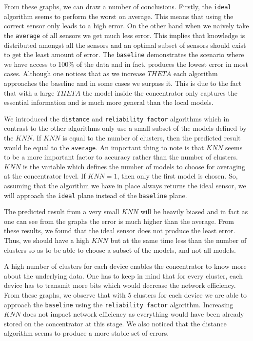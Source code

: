 \documentclass{mproj}
\begin{document}
From these graphs, we can draw a number of conclusions. Firstly, the \texttt{ideal} algorithm seems to perform the worst on average. This means that using the correct sensor only leads to a high error. On the other hand when we naively take the \texttt{average} of all sensors we get much less error. This implies that knowledge is distributed amongst all the sensors and an optimal subset of sensors should exist to get the least amount of error. The \texttt{baseline} demonstrates the scenario where we have access to 100\% of the data and in fact, produces the lowest error in most cases. Although one notices that as we increase $THETA$ each algorithm approaches the baseline and in some cases we surpass it. This is due to the fact that with a large $THETA$ the model inside the concentrator only captures the essential information and is much more general than the local models.

We introduced the \texttt{distance} and \texttt{reliability factor} algorithms which in contrast to the other algorithms only use a small subset of the models defined by the $KNN$. If $KNN$ is equal to the number of clusters, then the predicted result would be equal to the \texttt{average}. An important thing to note is that $KNN$ seems to be a more important factor to accuracy rather than the number of clusters. $KNN$ is the variable which defines the number of models to choose for averaging at the concentrator level. If $KNN=1$, then only the first model is chosen. So, assuming that the algorithm we have in place always returns the ideal sensor, we will approach the \texttt{ideal} plane instead of the \texttt{baseline} plane.

The predicted result from a very small $KNN$ will be heavily biased and in fact as one can see from the graphs the error is much higher than the average. From these results, we found that the ideal sensor does not produce the least error. Thus, we should have a high $KNN$ but at the same time less than the number of clusters so as to be able to choose a subset of the models, and not all models.

A high number of clusters for each device enables the concentrator to know more about the underlying data. One has to keep in mind that for every cluster, each device has to transmit more bits which would decrease the network efficiency. From these graphs, we observe that with 5 clusters for each device we are able to approach the \texttt{baseline} using the \texttt{reliability factor} algorithm. Increasing $KNN$ does not impact network efficiency as everything would have been already stored on the concentrator at this stage. We also noticed that the distance algorithm seems to produce a more stable set of errors.
\end{document}
